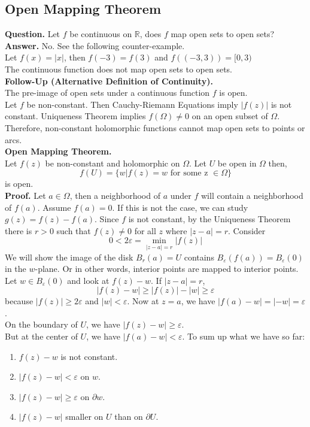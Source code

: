 \documentclass[11pt]{article}
\begin{document}
\subsection{Open Mapping Theorem}
\textbf{Question.} Let $f$ be continuous on $\mathbb{R}$, does $f$ map open sets to open sets? \\
\textbf{Answer.} No. See the following counter-example. \\
Let $ f(x) = |x| $, then $ f(-3) = f(3)$ and $f((-3, 3)) = [0, 3)$ \\
The continuous function does not map open sets to open sets.\\
\textbf{Follow-Up (Alternative Definition of Continuity).} \\
The pre-image of open sets under a continuous function $f$ is open. \\
\newline
Let $f$ be non-constant. Then Cauchy-Riemann Equations imply $|f(z)|$ is not constant. Uniqueness Theorem implies $f(\Omega) \neq 0$ on an open subset of $\Omega$. Therefore, non-constant holomorphic functions cannot map open sets to points or arcs. \\
\newline
\textbf{Open Mapping Theorem.} \\
Let $f(z)$ be non-constant and holomorphic on $\Omega$. Let $U$ be open in $\Omega$ then, 
$$ f(U) = \{w| f(z) = w \mbox{ for some z } \in \Omega \} $$ 
is open. \\
\textbf{Proof.} Let $a \in \Omega$, then a neighborhood of $a$ under $f$ will contain a neighborhood of $f(a)$. Assume $f(a) = 0$. If this is not the case, we can study $g(z) = f(z) - f(a)$. Since $f$ is not constant, by the Uniqueness Theorem there is $r > 0$ such that $f(z) \neq 0$ for all $z$ where $|z - a| = r$. Consider 
$$ 0 < 2\varepsilon = \min_{|z - a| = r}|f(z)|$$
We will show the image of the disk $B_r(a) = U$ contains $B_\varepsilon(f(a)) = B_\varepsilon(0)$ in the $w$-plane. Or in other words, interior points are mapped to interior points. Let $w \in B_\varepsilon(0)$ and look at $f(z) - w$. If $|z - a| = r$, 
$$|f(z) - w| \geqslant |f(z)| - |w| \geqslant \varepsilon$$
because $|f(z)| \geqslant 2\varepsilon$ and $|w| < \varepsilon$. Now at $z = a$, we have $|f(a) - w| = |-w| = \varepsilon$. \\
On the boundary of $U$, we have $|f(z) - w| \geqslant \varepsilon$. \\
But at the center of $U$, we have $|f(a) - w| < \varepsilon$. 
To sum up what we have so far: 
\begin{enumerate}[nolistsep]
\item $f(z) - w$ is not constant.
\item $|f(z) - w| < \varepsilon$ on $w$.
\item $|f(z) - w| \geqslant \varepsilon$ on $\partial w$.
\item $|f(z) - w|$ smaller on $U$ than on $\partial U$. 
\end{enumerate}
\end{document}
